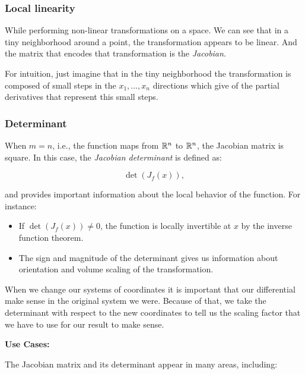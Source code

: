\subsubsection{Local linearity}

While performing non-linear transformations on a space. We can see that in a tiny neighborhood
around a point, the transformation appears to be linear. And the matrix that encodes that
transformation is the \emph{Jacobian}.

For intuition, just imagine that in the tiny neighborhood the transformation is composed
of small steps in the \(x_1, \dots, x_n\) directions which give of the partial derivatives that
represent this small steps. 

\subsubsection{Determinant}
When \(m = n\), i.e., the function maps from \(\mathbb{R}^n\) to \(\mathbb{R}^n\), the Jacobian matrix is square. 
In this case, the \emph{Jacobian determinant} is defined as:

\[
    \det(J_{f}(x)),
\]

and provides important information about the local behavior of the function. For instance:

\begin{itemize}

    \item If \(\det(J_{f}(x)) \neq 0\), the function is locally invertible at \(x\) by the inverse 
      function theorem.
  
      \item The sign and magnitude of the determinant 
      gives us information about orientation and volume scaling of the transformation.

\end{itemize}

When we change our systems of coordinates it is important that our differential make sense in the original 
system we were. Because of that, we take the determinant with respect to the new coordinates to tell us 
the scaling factor that we have to use for our result to make sense.

\textbf{Use Cases:}

The Jacobian matrix and its determinant appear in many areas, including:

